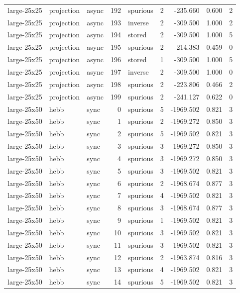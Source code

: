 \begin{tabular}{lllrlrrrr}
large-25x25 & projection & async & 192 & spurious & 2 & -235.660 & 0.600 & 2 \\
large-25x25 & projection & async & 193 & inverse & 2 & -309.500 & 1.000 & 2 \\
large-25x25 & projection & async & 194 & stored & 2 & -309.500 & 1.000 & 5 \\
large-25x25 & projection & async & 195 & spurious & 2 & -214.383 & 0.459 & 0 \\
large-25x25 & projection & async & 196 & stored & 1 & -309.500 & 1.000 & 5 \\
large-25x25 & projection & async & 197 & inverse & 2 & -309.500 & 1.000 & 0 \\
large-25x25 & projection & async & 198 & spurious & 2 & -223.806 & 0.466 & 2 \\
large-25x25 & projection & async & 199 & spurious & 2 & -241.127 & 0.622 & 0 \\
large-25x50 & hebb & sync & 0 & spurious & 5 & -1969.502 & 0.821 & 3 \\
large-25x50 & hebb & sync & 1 & spurious & 2 & -1969.272 & 0.850 & 3 \\
large-25x50 & hebb & sync & 2 & spurious & 5 & -1969.502 & 0.821 & 3 \\
large-25x50 & hebb & sync & 3 & spurious & 3 & -1969.272 & 0.850 & 3 \\
large-25x50 & hebb & sync & 4 & spurious & 3 & -1969.272 & 0.850 & 3 \\
large-25x50 & hebb & sync & 5 & spurious & 3 & -1969.502 & 0.821 & 3 \\
large-25x50 & hebb & sync & 6 & spurious & 2 & -1968.674 & 0.877 & 3 \\
large-25x50 & hebb & sync & 7 & spurious & 4 & -1969.502 & 0.821 & 3 \\
large-25x50 & hebb & sync & 8 & spurious & 3 & -1968.674 & 0.877 & 3 \\
large-25x50 & hebb & sync & 9 & spurious & 1 & -1969.502 & 0.821 & 3 \\
large-25x50 & hebb & sync & 10 & spurious & 3 & -1969.502 & 0.821 & 3 \\
large-25x50 & hebb & sync & 11 & spurious & 3 & -1969.502 & 0.821 & 3 \\
large-25x50 & hebb & sync & 12 & spurious & 2 & -1963.874 & 0.816 & 3 \\
large-25x50 & hebb & sync & 13 & spurious & 4 & -1969.502 & 0.821 & 3 \\
large-25x50 & hebb & sync & 14 & spurious & 5 & -1969.502 & 0.821 & 3 \\

\end{tabular}
